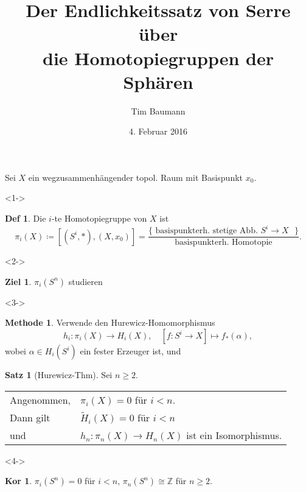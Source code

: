 \documentclass{beamer}
\title{Der Endlichkeitssatz von Serre über \\ die Homotopiegruppen der Sphären}
\author{Tim Baumann}
\institute{Universität Augsburg}
\date{4. Februar 2016}
\newcommand{\Z}{\mathbb{Z}} %
\theoremstyle{definition}
\newtheorem*{defn}{Def} %
\newtheorem*{ziel}{Ziel}
\newtheorem*{satz}{Satz}
\newtheorem*{methode}{Methode}
\newtheorem*{kor}{Kor} %
\renewcommand{\emph}[1]{\textcolor{Emph}{#1}}
\begin{document}

\begin{frame}
  \titlepage
\end{frame}

\begin{frame}[t]
  Sei $X$ ein wegzusammenhängender topol. Raum mit Basispunkt $x_0$.
  
  \begin{onlyenv}<1->
  \begin{defn}
    Die \emph{$i$-te Homotopiegruppe} von $X$ ist
    \[
      \pi_i(X) \coloneqq [(S^i, *), (X, x_0)] = \frac{\{ \text{ basispunkterh. stetige Abb. $S^i \to X$ } \}}{\text{basispunkterh. Homotopie}}.
    \]
  \end{defn}
  \end{onlyenv}
  
  \begin{onlyenv}<2->
  \vspace{-1em}
  \begin{ziel}
    $\pi_i(S^n)$ studieren
  \end{ziel}
  \end{onlyenv}
  
  \begin{onlyenv}<3->
  \begin{methode}
    Verwende den \emph{Hurewicz-Homomorphismus}
    \[
      h_i : \pi_i(X) \to H_i(X), \quad
      [f : S^i \to X] \mapsto f_*(\alpha),
    \]
    wobei $\alpha \in H_i(S^i)$ ein fester Erzeuger ist, und
  \end{methode}
  
  \begin{satz}[Hurewicz-Thm]
    Sei $n \geq 2$.

    \begin{tabular}{l l}
      Angenommen, & $\pi_i(X) = 0$ \enspace für $i < n$. \\
      Dann gilt & $\widetilde{H}_i(X) = 0$ \enspace für $i < n$ \\
      und & $h_n : \pi_n(X) \to H_n(X)$ ist ein Isomorphismus.
    \end{tabular}
  \end{satz}
  \end{onlyenv}
  
  \begin{onlyenv}<4->
    \begin{kor}
      $\pi_i(S^n) = 0$ für $i < n$, \quad
      $\pi_n(S^n) \cong \Z$ für $n \geq 2$.
    \end{kor}
  \end{onlyenv}
\end{frame}
\end{document}
